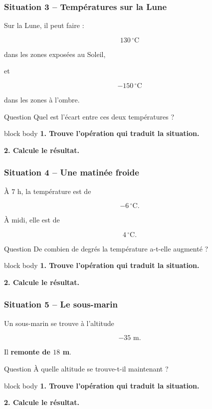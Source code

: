\documentclass[aspectratio=169]{beamer}
\newcommand{\consigne}{%
\begin{beamercolorbox}[
  rounded=true,
  sep=0.8em,
  wd=\textwidth
]{block body}
\centering
\textbf{1. Trouve l'opération qui traduit la situation.}

\medskip

\textbf{2. Calcule le résultat.}
\end{beamercolorbox}
}
\begin{document}
\begin{frame}
\frametitle{Situation 3 -- Températures sur la Lune}

Sur la Lune, il peut faire :

\[
130\,^\circ\mathrm{C}
\]

dans les zones exposées au Soleil,

\medskip

et

\[
-150\,^\circ\mathrm{C}
\]

dans les zones à l'ombre.

\vspace{0.4cm}

\begin{block}{Question}
Quel est l'écart entre ces deux températures ?
\end{block}

\vfill

\consigne

\end{frame}

\begin{frame}
\frametitle{Situation 4 -- Une matinée froide}

À \(7\) h, la température est de

\[
-6\,^\circ\mathrm{C}.
\]

À midi, elle est de

\[
4\,^\circ\mathrm{C}.
\]

\vspace{0.4cm}

\begin{block}{Question}
De combien de degrés la température a-t-elle augmenté ?
\end{block}

\vfill

\consigne

\end{frame}

\begin{frame}
\frametitle{Situation 5 -- Le sous-marin}

Un sous-marin se trouve à l'altitude

\[
-35\text{ m}.
\]

Il \textbf{remonte de \(18\) m}.

\vspace{0.5cm}

\begin{block}{Question}
À quelle altitude se trouve-t-il maintenant ?
\end{block}

\vfill

\consigne

\end{frame}
\end{document}
